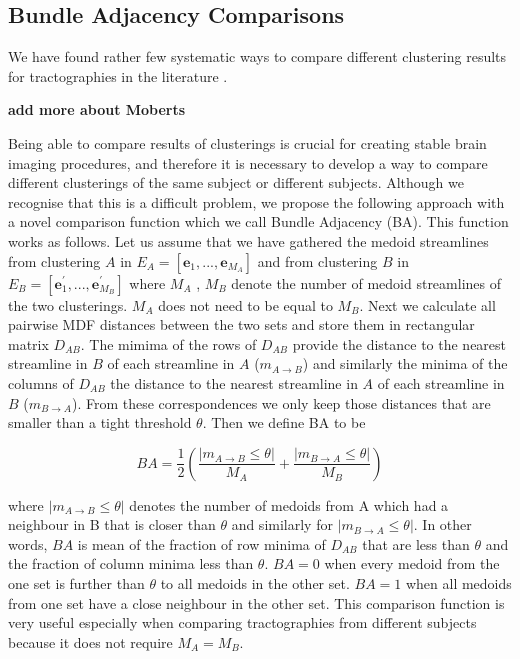 \documentclass{bioinfo}
\begin{document}
\begin{methods}
\subsection{Bundle Adjacency Comparisons\label{sub:Tightness-comparisons-1}}

We have found rather few systematic ways to compare different clustering
results for tractographies in the literature
\citep{moberts2005evaluation}.  

\textbf{add more about Moberts}

Being able to compare results of clusterings is crucial for creating
stable brain imaging procedures, and therefore it is necessary to
develop a way to compare different clusterings of the same subject or
different subjects. Although we recognise that this is a difficult
problem, we propose the following approach with a novel comparison
function which we call Bundle Adjacency (BA). This function works as
follows. Let us assume that we have gathered the medoid streamlines from
clustering $A$ in $E_{A}=[\mathbf{e}_{1},...,\mathbf{e}_{M_{A}}]$ and
from clustering $B$ in
$E_{B}=[\mathbf{e}_{1}^{'},...,\mathbf{e}_{M_{B}}^{'}]$ where $M_A$ ,
$M_B$ denote the number of medoid streamlines of the two
clusterings. $M_{A}$ does not need to be equal to $M_{B}$. Next we
calculate all pairwise MDF distances between the two sets and store them
in rectangular matrix $D_{AB}$. The mimima of the rows of $D_{AB}$
provide the distance to the nearest streamline in $B$ of each streamline
in $A$ ($m_{A\rightarrow B}$) and similarly the minima of the columns of
$D_{AB}$ the distance to the nearest streamline in $A$ of each
streamline in $B$ ($m_{B\rightarrow A}$). From these correspondences we
only keep those distances that are smaller than a tight threshold
$\theta$. Then we define BA to be

\begin{equation}
BA=\frac{1}{2}\left(\frac{|m_{A\rightarrow B}\leq \theta |}{M_{A}}+\frac{|m_{B\rightarrow A}\leq \theta |}{M_{B}}\right)\label{eq:TC}
\end{equation}

\noindent where $|m_{A\rightarrow B}\leq \theta |$ denotes the number of
medoids from A which had a neighbour in B that is closer than $\theta$
and similarly for $|m_{B\rightarrow A}\leq \theta |$.  In other words,
$BA$ is mean of the fraction of row minima of $D_{AB}$ that are less
than $\theta$ and the fraction of column minima less than $\theta$.
$BA=0$ when every medoid from the one set is further than $\theta$ to
all medoids in the other set. $BA=1$ when all medoids from one set have
a close neighbour in the other set. This comparison function is very
useful especially when comparing tractographies from different subjects
because it does not require $M_{A}=M_{B}$.


\end{methods}
\end{document}
